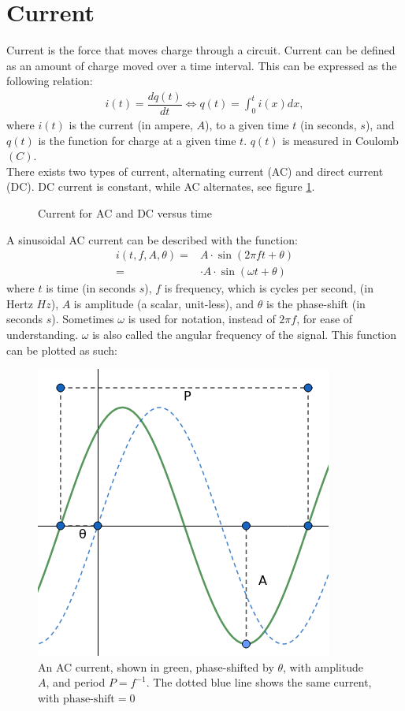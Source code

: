 \section{Current}
Current is the force that moves charge through a circuit. Current can be defined as an amount of charge moved over a time interval. This can be expressed as the following relation:
\begin{align}
i(t)=\dfrac{dq(t)}{dt} \Leftrightarrow q(t)=\int_{0}^{t}i(x)dx,
\label{I=dq/dt}
\end{align}
where $i(t)$ is the current (in ampere, $A$), to a given time $t$ (in seconds, $s$), and $q(t)$ is the function for charge at a given time $t$. $q(t)$ is measured in Coulomb$(C)$.
\\
There exists two types of current, alternating current (AC) and direct current (DC). DC current is constant, while AC alternates, see figure \ref{fig:ACDC}. 
\begin{figure}[H] 

\caption{Current for AC and DC versus time}
\label{fig:ACDC}
\end{figure}
A sinusoidal AC current can be described with the function: 
\begin{align*}
	i(t, f, A, \theta) =& A\cdot \sin{(2\pi ft + \theta)} \\
	=& \cdot A \cdot \sin{(\omega t + \theta)}
\end{align*}
where $t$ is time (in seconds $s$), $f$ is frequency, which is cycles per second, (in Hertz $Hz$), $A$ is amplitude (a scalar, unit-less), and $\theta$ is the phase-shift (in seconds $s$).
Sometimes $\omega$ is used for notation, instead of $2\pi f$, for ease of understanding. $\omega$ is also called the angular frequency of the signal.
This function can be plotted as such:
\begin{figure}[H]
	\centering
	\includegraphics[scale=0.7]{fig/img/AC.png}
	\caption{An AC current, shown in green, phase-shifted by $\theta$, with amplitude $A$, and period $P=f^{-1}$. The dotted blue line shows the same current, with $\text{phase-shift} =0$}
\end{figure}



